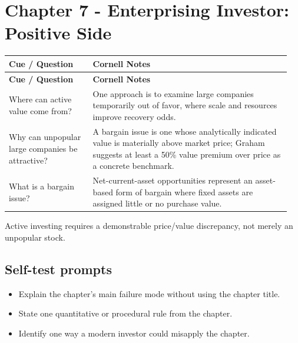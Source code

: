 \documentclass[11pt]{article}
\begin{document}
\section{Chapter 7 - Enterprising Investor: Positive Side}
\begin{longtable}{@{}>{\raggedright\arraybackslash}p{0.29\linewidth}>{\raggedright\arraybackslash}p{0.66\linewidth}@{}}\toprule\textbf{Cue / Question} & \textbf{Cornell Notes}\\\midrule\endfirsthead\toprule\textbf{Cue / Question} & \textbf{Cornell Notes}\\\midrule\endhead
Where can active value come from? & One approach is to examine large companies temporarily out of favor, where scale and resources improve recovery odds. \\
Why can unpopular large companies be attractive? & A bargain issue is one whose analytically indicated value is materially above market price; Graham suggests at least a 50\% value premium over price as a concrete benchmark. \\
What is a bargain issue? & Net-current-asset opportunities represent an asset-based form of bargain where fixed assets are assigned little or no purchase value. \\
\bottomrule\end{longtable}
\begin{principlebox}Active investing requires a demonstrable price/value discrepancy, not merely an unpopular stock.\end{principlebox}
\subsection*{Self-test prompts}\begin{itemize}\item Explain the chapter's main failure mode without using the chapter title.\item State one quantitative or procedural rule from the chapter.\item Identify one way a modern investor could misapply the chapter.\end{itemize}
\end{document}
